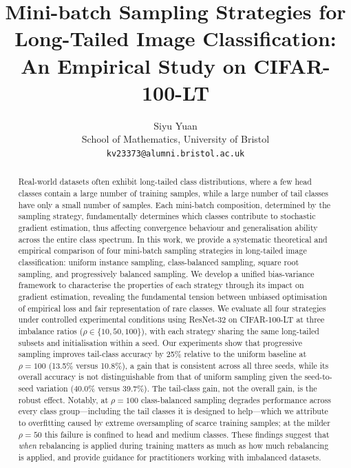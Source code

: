 \documentclass[12pt,a4paper]{article}
\begin{document}
\title{Mini-batch Sampling Strategies for\\
       Long-Tailed Image Classification:\\[0.2em]
       An Empirical Study on CIFAR-100-LT}

\author{Siyu Yuan\\
  School of Mathematics, University of Bristol\\
  \texttt{kv23373@alumni.bristol.ac.uk}}

\date{}

\maketitle

\begin{abstract}
Real-world datasets often exhibit long-tailed class distributions, where a few head classes contain a large number of training samples, while a large number of tail classes have only a small number of samples. Each mini-batch composition, determined by the sampling strategy, fundamentally determines which classes contribute to stochastic gradient estimation, thus affecting convergence behaviour and generalisation ability across the entire class spectrum. In this work, we provide a systematic theoretical and empirical comparison of four mini-batch sampling strategies in long-tailed image classification: uniform instance sampling, class-balanced sampling, square root sampling, and progressively balanced sampling. We develop a unified bias-variance framework to characterise the properties of each strategy through its impact on gradient estimation, revealing the fundamental tension between unbiased optimisation of empirical loss and fair representation of rare classes. We evaluate all four strategies under controlled experimental conditions using ResNet-32 on CIFAR-100-LT at three imbalance ratios ($\rho \in \{10, 50, 100\}$), with each strategy sharing the same long-tailed subsets and initialisation within a seed. Our experiments show that progressive sampling improves tail-class accuracy by 25\% relative to the uniform baseline at $\rho = 100$ (13.5\% versus 10.8\%), a gain that is consistent across all three seeds, while its overall accuracy is not distinguishable from that of uniform sampling given the seed-to-seed variation (40.0\% versus 39.7\%). The tail-class gain, not the overall gain, is the robust effect. Notably, at $\rho = 100$ class-balanced sampling degrades performance across every class group---including the tail classes it is designed to help---which we attribute to overfitting caused by extreme oversampling of scarce training samples; at the milder $\rho = 50$ this failure is confined to head and medium classes. These findings suggest that \emph{when} rebalancing is applied during training matters as much as how much rebalancing is applied, and provide guidance for practitioners working with imbalanced datasets.
\end{abstract}
\end{document}
